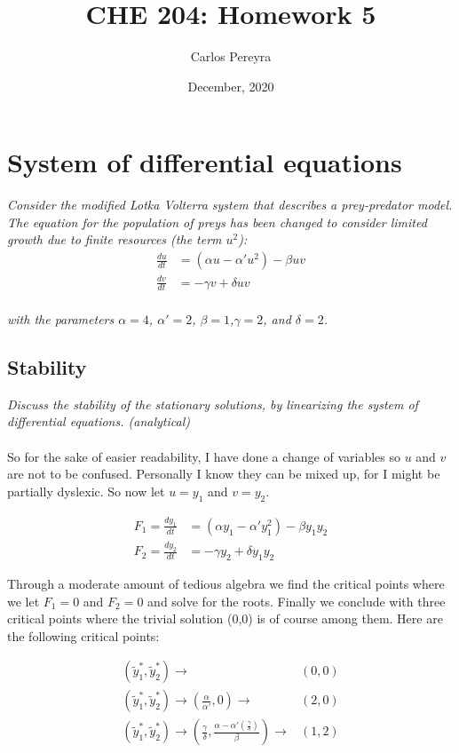\documentclass{article}
\begin{document}
 
 \title{CHE 204: Homework 5}
 \author{Carlos Pereyra}
 \date{December, 2020}
 \maketitle
 
 \section{System of differential equations}
\textit{Consider the modified Lotka Volterra system that describes a prey-predator model. The equation for the population of preys has been changed to consider limited growth due to finite resources (the term $u^2$):}\\
\begin{align}
\frac{du}{dt} &= (\alpha u - \alpha' u^{2}) - \beta u v \\
\frac{dv}{dt} &= -\gamma v + \delta u v
\end{align}
\\
\textit{with the parameters $\alpha = 4$, $\alpha' = 2$, $\beta = 1$,$\gamma = 2$, and $\delta = 2$.}

\subsection{Stability}
\textit{Discuss the stability of the stationary solutions, by linearizing the system of differential equations. (analytical)}
\\ \\
So for the sake of easier readability, I have done a change of variables so $u$ and $v$ are not to be confused. Personally I know they can be mixed up, for I might be partially dyslexic. So now let $u=y_1$ and $v=y_2$.

\begin{align}
\label{eqn:base1} F_1 = \frac{dy_1}{dt} &= (\alpha y_1 - \alpha' y_1^2) - \beta y_1 y_2\\
 F_2 = \frac{dy_2}{dt} &= -\gamma y_2 + \delta y_1 y_2
\end{align}

Through a moderate amount of tedious algebra we find the critical points where we let $F_1=0$ and $F_2=0$ and solve for the roots. Finally we conclude with three critical points where the trivial solution (0,0) is of course among them. Here are the following critical points: 
\\
\begin{mybox}[standard jigsaw, opacityback=0, title=critical points, colframe=black!30!black]
\begin{align}
(\tilde{y}_1^*, \tilde{y}_2^*) \rightarrow &(0,0) \\[6pt]
(\tilde{y}_1^*, \tilde{y}_2^*) \rightarrow (\frac{\alpha}{\alpha'}, 0) \rightarrow &(2,0) \\[6pt]
(\tilde{y}_1^*, \tilde{y}_2^*) \rightarrow (\frac{\gamma}{\delta}, \frac{\alpha - \alpha'\left(\frac{\gamma}{\delta}\right)}{\beta}) \rightarrow &(1,2)
\end{align}
\end{mybox}
\end{document}
